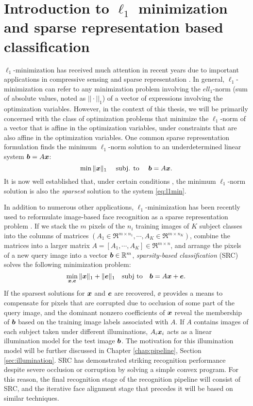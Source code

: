 \section{Introduction to $\ell_1$ minimization and sparse representation based classification}
%
$\ell_1$-minimization has received much attention in recent years due to
important applications in compressive sensing \cite{BrucksteinA2007} and sparse
representation \cite{WrightJ2010-PIEEE}.  
In general, $\ell_1$-minimization can refer to any minimization problem involving the 
$ell_1$-norm (sum of absolute values, noted as $||\cdot||_1$) of a vector of expressions involving the optimization
variables. However, in the context of this thesis, we will be primarily concerned with
the class of optimization problems that minimize the $\ell_1$-norm of a vector that
is affine in the optimization variables, under constraints that are also affine in the optimization variables.
One common sparse representation formulation finds the minimum $\ell_1$-norm solution to an
underdetermined linear system $\boldsymbol{b}=A{\boldsymbol{x}}$:
%
\begin{equation} \min \|{\boldsymbol{x}}\|_1\quad \mbox{ subj. to }\quad \boldsymbol{b} = A{\boldsymbol{x}}.
\label{eq:l1min} \end{equation}
%
It is now well established that, under certain conditions
\cite{CandesE2005-IT_1,DonohoD2004}, the minimum $\ell_1$-norm solution is also
the \emph{sparsest} solution to the system \eqref{eq:l1min}.

In addition to numerous other applications, $\ell_1$-minimization has been recently used to reformulate
image-based face recognition as a sparse representation problem
\cite{WrightJ2009-PAMI}.  If we stack the $m$ pixels of the $n_i$ training images of $K$ subject
classes into the columns of matrices $(A_1\in\Re^{m\times n_1}, \cdots, A_K\in\Re^{m\times n_K})$, combine
the matrices into a larger matrix $A = [A_1, \cdots, A_K]\in\Re^{m\times n}$, and arrange the pixels of a new
query image into a vector $\boldsymbol{b}\in\mathbb R^m$, \emph{sparsity-based
classification} (SRC) solves the following minimization problem:
\begin{equation}
\min_{{\boldsymbol{x}}, {\boldsymbol{e}}} \| {\boldsymbol{x}} \|_1 + \|{\boldsymbol{e}}\|_1 \quad \textup{subj to} \quad \boldsymbol{b} = A {\boldsymbol{x}} + {\boldsymbol{e}}.
\label{eq:l1min_denoise}
\end{equation}
If the sparsest solutions for ${\boldsymbol{x}}$ and $\boldsymbol{e}$ are recovered, $\ee$ provides a
means to compensate for pixels that are corrupted due to occlusion of some part of the query
image, and the dominant nonzero coefficients of ${\boldsymbol{x}}$ reveal the membership of
$\boldsymbol{b}$ based on the training image labels associated with $A$. 
If $A$ contains images of each subject taken under different illuminations, 
$A_i{\boldsymbol{x}}_i$ acts as a linear illumination model for the test image $\boldsymbol{b}$.  The motivation
for this illumination model will be further discussed in Chapter \ref{chap:pipeline}, Section \ref{sec:illumination}.
SRC has demonstrated striking recognition performance
despite severe occlusion or corruption by solving a simple convex program.  For
this reason, the final recognition stage of the recognition pipeline will consist of
SRC, and the iterative face alignment stage that precedes it will be based on
similar techniques.

